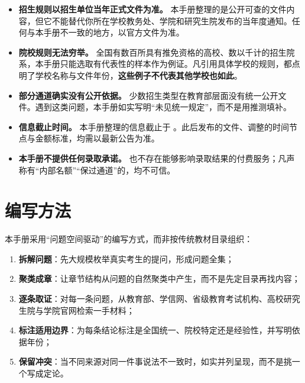 \begin{itemize}
\item \textbf{招生规则以招生单位当年正式文件为准。} 本手册整理的是公开可查的文件内容，但它不能替代你所在学校教务处、学院和研究生院发布的当年度通知。任何与本手册不一致的地方，以官方文件为准。
\item \textbf{院校规则无法穷举。} 全国有数百所具有推免资格的高校、数以千计的招生院系，本手册只能选取有代表性的样本作为例证。凡引用具体学校的规则，都点明了学校名称与文件年份，\textbf{这些例子不代表其他学校也如此}。
\item \textbf{部分通道确实没有公开依据。} 少数招生类型在教育部层面没有统一公开文件。遇到这类问题，本手册如实写明“未见统一规定”，而不是用推测填补。
\item \textbf{信息截止时间。} 本手册整理的信息截止于 \handbookdate。此后发布的文件、调整的时间节点与金额标准，均需以最新公告为准。
\item \textbf{本手册不提供任何录取承诺。} 也不存在能够影响录取结果的付费服务；凡声称有“内部名额”“保过通道”的，均不可信。
\end{itemize}

\section*{编写方法}

本手册采用“问题空间驱动”的编写方式，而非按传统教材目录组织：

\begin{enumerate}
\item \textbf{拆解问题}：先大规模枚举真实考生的提问，形成问题全集；
\item \textbf{聚类成章}：让章节结构从问题的自然聚类中产生，而不是先定目录再找内容；
\item \textbf{逐条取证}：对每一条问题，从教育部、学信网、省级教育考试机构、高校研究生院与学院官网检索一手材料；
\item \textbf{标注适用边界}：为每条结论标注是全国统一、院校特定还是经验性，并写明依据年份；
\item \textbf{保留冲突}：当不同来源对同一件事说法不一致时，如实并列呈现，而不是挑一个写成定论。
\end{enumerate}

\vspace{1em}

